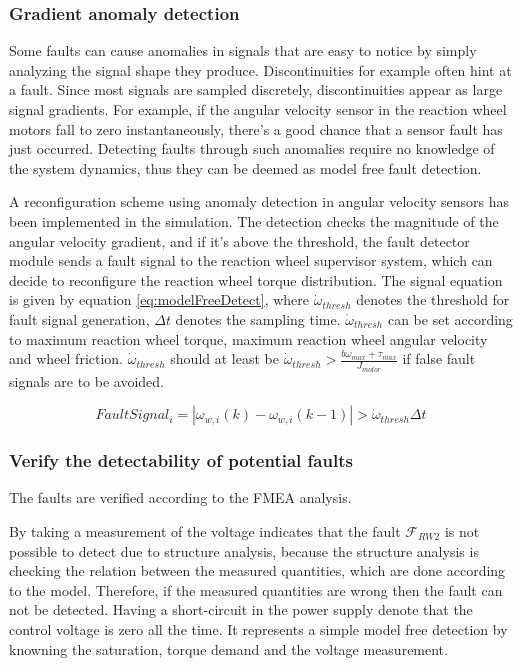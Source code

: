 \subsubsection{Gradient anomaly detection }
\label{sec:ModelFreeFD}

Some faults can cause anomalies in signals that are easy to notice by simply analyzing the signal shape they produce. Discontinuities for example often hint at a fault. Since most signals are sampled discretely, discontinuities appear as large signal gradients. For example, if the angular velocity sensor in the reaction wheel motors fall to zero instantaneously, there's a good chance that a sensor fault has just occurred. Detecting faults through such anomalies require no knowledge of the system dynamics, thus they can be deemed as model free fault detection. 

A reconfiguration scheme using anomaly detection in angular velocity sensors has been implemented in the simulation. The detection checks the magnitude of the angular velocity gradient, and if it's above the threshold, the fault detector module sends a fault signal to the reaction wheel supervisor system, which can decide to reconfigure the reaction wheel torque distribution. The signal equation is given by equation \ref{eq:modelFreeDetect}, where $\dot{\omega}_{thresh}$ denotes the threshold for fault signal generation, $\Delta t$ denotes the sampling time.  $\dot{\omega}_{thresh}$ can be set according to maximum reaction wheel torque, maximum reaction wheel angular velocity and wheel friction. $\dot{\omega}_{thresh}$ should at  least be $\dot{\omega}_{thresh} > \frac{b \omega_{max} + \tau_{max}}{J_{motor}}$ if false fault signals are to be avoided.

\begin{equation}
\label{eq:modelFreeDetect}
FaultSignal_i = |\omega_{w,i}(k) - \omega_{w,i}(k-1)| > \dot{\omega}_{thresh} \Delta t
\end{equation}

\subsubsection{Verify the detectability of potential faults}
The faults are verified according to the FMEA analysis.

By taking a measurement of the voltage indicates that the fault $\mathcal{F}_{RW2}$ is not possible to detect due to structure analysis, because the structure analysis is checking the relation between the measured quantities, which are done according to the model. Therefore, if the measured quantities are wrong then the fault can not be detected.  Having a short-circuit in the power supply denote that the control voltage is zero all the time. It represents a simple model free detection by knowning the saturation, torque demand and the voltage measurement.

